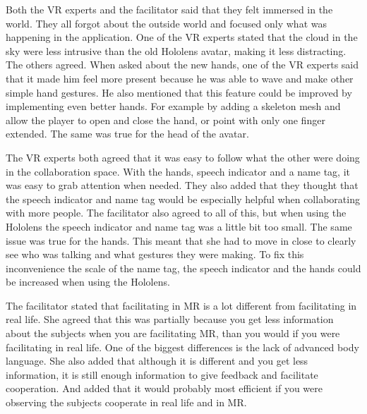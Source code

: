         Both the VR experts and the facilitator said that they felt immersed in the world. They all forgot about the outside world and focused only what was happening in the application. One of the VR experts stated that the cloud in the sky were less intrusive than the old Hololens avatar, making it less distracting. The others agreed. When asked about the new hands, one of the VR experts said that it made him feel more present because he was able to wave and make other simple hand gestures. He also mentioned that this feature could be improved by implementing even better hands. For example by adding a skeleton mesh and allow the player to open and close the hand, or point with only one finger extended. The same was true for the head of the avatar.  %
        
        The VR experts both agreed that it was easy to follow what the other were doing in the collaboration space. With the hands, speech indicator and a name tag, it was easy to grab attention when needed. They also added that they thought that the speech indicator and name tag would be especially helpful when collaborating with more people. The facilitator also agreed to all of this, but when using the Hololens the speech indicator and name tag was a little bit too small. The same issue was true for the hands. This meant that she had to move in close to clearly see who was talking and what gestures they were making. To fix this inconvenience the scale of the name tag, the speech indicator and the hands could be increased when using the Hololens.
        
        The facilitator stated that facilitating in MR is a lot different from facilitating in real life. She agreed that this was partially because you get less information about the subjects when you are facilitating MR, than you would if you were facilitating in real life. One of the biggest differences is the lack of advanced body language. She also added that although it is different and you get less information, it is still enough information to give feedback and facilitate cooperation. And added that it would probably most efficient if you were observing the subjects cooperate in real life and in MR.
        
